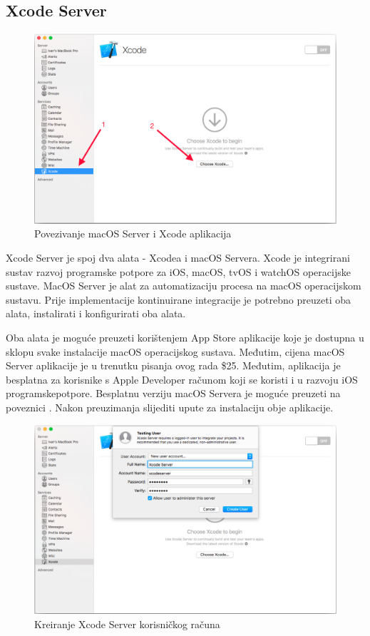 \documentclass[times, utf8, diplomski, numeric]{fer}
\begin{document}
\subsection{Xcode Server}

\begin{figure}
\centering
\includegraphics[scale=0.35]{XcodeServerSetup1}
\caption{Povezivanje macOS Server i Xcode aplikacija}
\label{fig:XcodeServerSetup1}
\end{figure}

Xcode Server je spoj dva alata - Xcodea i macOS Servera. Xcode je integrirani sustav razvoj programske potpore za iOS, macOS, tvOS i watchOS operacijske sustave. MacOS Server je alat za automatizaciju procesa na macOS operacijskom sustavu. Prije implementacije kontinuirane integracije je potrebno preuzeti oba alata, instalirati i konfigurirati oba alata.

Oba alata je moguće preuzeti korištenjem App Store aplikacije koje je dostupna u sklopu svake instalacije macOS operacijskog sustava. Međutim, cijena macOS Server aplikacije je u trenutku pisanja ovog rada \$25. Međutim, aplikacija je besplatna za korisnike s Apple Developer računom koji se koristi i u razvoju iOS programskepotpore. Besplatnu verziju macOS Servera je moguće preuzeti na poveznici . Nakon preuzimanja slijediti upute za instalaciju obje aplikacije.

\begin{figure}
\centering
\includegraphics[scale=0.35]{XcodeServerSetup2}
\caption{Kreiranje Xcode Server korisničkog računa}
\label{fig:XcodeServerSetup2}
\end{figure}
\end{document}
